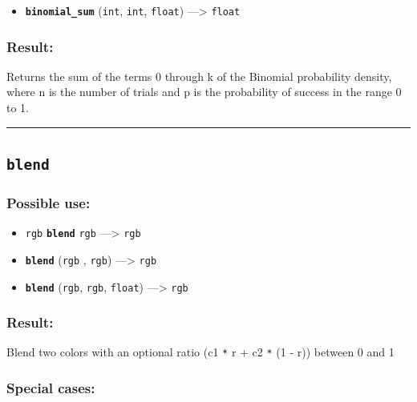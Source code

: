 \documentclass[]{book}
\providecommand{\tightlist}{%
  \setlength{\itemsep}{0pt}\setlength{\parskip}{0pt}}
\theoremstyle{definition}
\theoremstyle{definition}
\theoremstyle{definition}
\theoremstyle{remark}
\begin{document}
\begin{itemize}
\tightlist
\item
  \textbf{\texttt{binomial\_sum}} (\texttt{int}, \texttt{int},
  \texttt{float}) ---\textgreater{} \texttt{float}
\end{itemize}

\subsubsection{Result:}\label{result-72}

Returns the sum of the terms 0 through k of the Binomial probability
density, where n is the number of trials and p is the probability of
success in the range 0 to 1.

\begin{center}\rule{0.5\linewidth}{\linethickness}\end{center}

\subsection{\texorpdfstring{\texttt{blend}}{blend}}\label{blend}

\subsubsection{Possible use:}\label{possible-use-74}

\begin{itemize}
\tightlist
\item
  \texttt{rgb} \textbf{\texttt{blend}} \texttt{rgb} ---\textgreater{}
  \texttt{rgb}
\item
  \textbf{\texttt{blend}} (\texttt{rgb} , \texttt{rgb})
  ---\textgreater{} \texttt{rgb}
\item
  \textbf{\texttt{blend}} (\texttt{rgb}, \texttt{rgb}, \texttt{float})
  ---\textgreater{} \texttt{rgb}
\end{itemize}

\subsubsection{Result:}\label{result-73}

Blend two colors with an optional ratio (c1 \texttt{*} r + c2 \texttt{*}
(1 - r)) between 0 and 1

\subsubsection{Special cases:}\label{special-cases-25}
\end{document}
